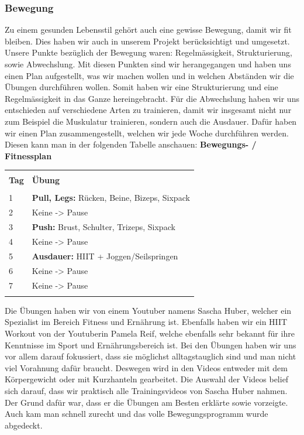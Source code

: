 \subsubsection{Bewegung}
Zu einem gesunden Lebensstil gehört auch eine gewisse Bewegung, damit wir fit bleiben. Dies haben wir auch in unserem Projekt berücksichtigt und umgesetzt. Unsere Punkte bezüglich der Bewegung waren: Regelmässigkeit, Strukturierung, sowie Abwechslung. Mit diesen Punkten sind wir herangegangen und haben uns einen Plan aufgestellt, was wir machen wollen und in welchen Abständen wir die Übungen durchführen wollen. Somit haben wir eine Strukturierung und eine Regelmässigkeit in das Ganze hereingebracht. Für die Abwechslung haben wir uns entschieden auf verschiedene Arten zu trainieren, damit wir insgesamt nicht nur zum Beispiel die Muskulatur trainieren, sondern auch die Ausdauer. Dafür haben wir einen Plan zusammengestellt, welchen wir jede Woche durchführen werden. Diesen kann man in der folgenden Tabelle anschauen:
\newline
\newline
\textbf{Bewegungs- / Fitnessplan}
\newline
\begin{table}[htp]
  \begin{tabularx}{\textwidth}{l X}\hline \\
    \textbf{Tag} & \textbf{Übung}  \\\hline \\
    1 & \textbf{Pull, Legs:} Rücken, Beine, Bizeps, Sixpack \\
    2 & Keine -> Pause \\
    3 & \textbf{Push:} Brust, Schulter, Trizeps, Sixpack \\
    4 & Keine -> Pause \\
    5 & \textbf{Ausdauer:} HIIT + Joggen/Seilspringen \\
    6 & Keine -> Pause \\
    7 & Keine -> Pause \\
    \\\hline
  \end{tabularx}
\end{table}
\newline
Die Übungen haben wir von einem Youtuber namens Sascha Huber, welcher ein Spezialist im Bereich Fitness und Ernährung ist. Ebenfalls haben wir ein HIIT Workout von der Youtuberin Pamela Reif, welche ebenfalls sehr bekannt für ihre Kenntnisse im Sport und Ernährungsbereich ist. Bei den Übungen haben wir uns vor allem darauf fokussiert, dass sie möglichst alltagstauglich sind und man nicht viel Vorahnung dafür braucht. Deswegen wird in den Videos entweder mit dem Körpergewicht oder mit Kurzhanteln gearbeitet. Die Auswahl der Videos belief sich darauf, dass wir praktisch alle Trainingsvideos von Sascha Huber nahmen. Der Grund dafür war, dass er die Übungen am Besten erklärte sowie vorzeigte. Auch kam man schnell zurecht und das volle Bewegungsprogramm wurde abgedeckt.
